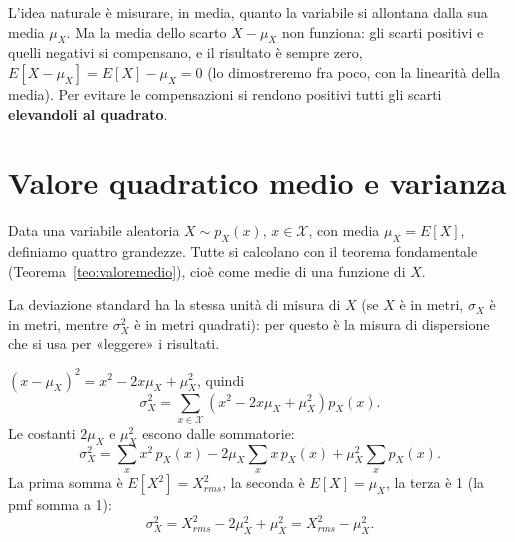 L'idea naturale è misurare, in media, quanto la variabile si allontana dalla sua media $\mu_X$. Ma la media dello
scarto $X - \mu_X$ non funziona: gli scarti positivi e quelli negativi si compensano, e il risultato è sempre zero,
$E[X - \mu_X] = E[X] - \mu_X = 0$ (lo dimostreremo fra poco, con la linearità della media). Per evitare le
compensazioni si rendono positivi tutti gli scarti \textbf{elevandoli al quadrato}.

\section{Valore quadratico medio e varianza}

Data una variabile aleatoria $X \sim p_X(x)$, $x \in \mathcal{X}$, con media $\mu_X = E[X]$, definiamo quattro
grandezze. Tutte si calcolano con il teorema fondamentale (Teorema~\ref{teo:valoremedio}), cioè come medie di una
funzione di $X$.



La deviazione standard ha la stessa unità di misura di $X$ (se $X$ è in metri, $\sigma_X$ è in metri, mentre
$\sigma_X^2$ è in metri quadrati): per questo è la misura di dispersione che si usa per «leggere» i risultati.


\begin{dimostrazione}
 $(x - \mu_X)^2 = x^2 - 2 x \mu_X + \mu_X^2$, quindi
\[ \sigma_X^2 = \sum_{x \in \mathcal{X}} \left( x^2 - 2 x \mu_X + \mu_X^2 \right) p_X(x) . \]
 Le costanti $2\mu_X$ e $\mu_X^2$ escono dalle sommatorie:
\[ \sigma_X^2 = \sum_{x} x^2\, p_X(x) - 2\mu_X \sum_{x} x\, p_X(x) + \mu_X^2 \sum_{x} p_X(x) . \]
 La prima somma è $E[X^2] = X_{rms}^2$, la seconda è $E[X] = \mu_X$, la terza è 1
(la pmf somma a 1):
\[ \sigma_X^2 = X_{rms}^2 - 2\mu_X^2 + \mu_X^2 = X_{rms}^2 - \mu_X^2 . \]
\end{dimostrazione}

